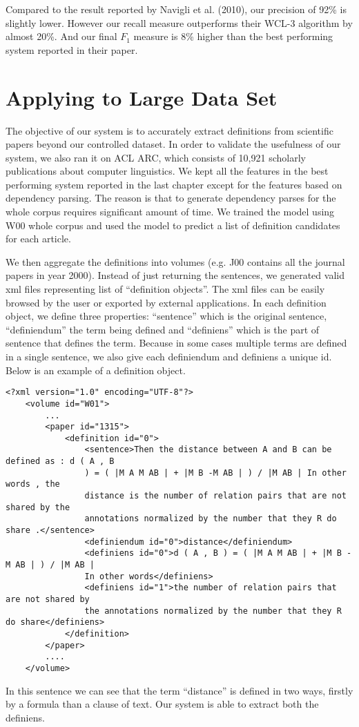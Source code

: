 \documentclass[hyp]{socreport}
\begin{document}
Compared to the result reported by Navigli et al. (2010), our precision of 92\% is slightly lower. However our recall measure outperforms their WCL-3 algorithm by almost 20\%. And our final $F_1$ measure is 8\% higher than the best performing system reported in their paper.

\chapter{Applying to Large Data Set}

The objective of our system is to accurately extract definitions from scientific papers beyond our controlled dataset. In order to validate the usefulness of our system, we also ran it on ACL ARC, which consists of 10,921 scholarly publications about computer linguistics. We kept all the features in the best performing system reported in the last chapter except for the features based on dependency parsing. The reason is that to generate dependency parses for the whole corpus requires significant amount of time. We trained the model using W00 whole corpus and used the model to predict a list of definition candidates for each article.  

We then aggregate the definitions into volumes (e.g. J00 contains all the journal papers in year 2000). Instead of just returning the sentences, we generated valid xml files representing list of ``definition objects''. The xml files can be easily browsed by the user or exported by external applications. In each definition object, we define three properties: ``sentence'' which is the original sentence, ``definiendum'' the term being defined and ``definiens'' which is the part of sentence that defines the term. Because in some cases multiple terms are defined in a single sentence, we also give each definiendum and definiens a unique id. Below is an example of a definition object. 
\newpage
\begin{lstlisting}
<?xml version="1.0" encoding="UTF-8"?>
	<volume id="W01">
		...	
		<paper id="1315">
			<definition id="0">
				<sentence>Then the distance between A and B can be defined as : d ( A , B 
				) = ( |M A M AB | + |M B -M AB | ) / |M AB | In other words , the 
				distance is the number of relation pairs that are not shared by the 
				annotations normalized by the number that they R do share .</sentence>
				<definiendum id="0">distance</definiendum>
				<definiens id="0">d ( A , B ) = ( |M A M AB | + |M B -M AB | ) / |M AB | 
				In other words</definiens>
				<definiens id="1">the number of relation pairs that are not shared by 
				the annotations normalized by the number that they R do share</definiens>
			</definition>
		</paper>
		....
	</volume>
\end{lstlisting}
\noindent
In this sentence we can see that the term ``distance'' is defined in two ways, firstly by a formula than a clause of text. Our system is able to extract both the definiens. 
 
\end{document}
